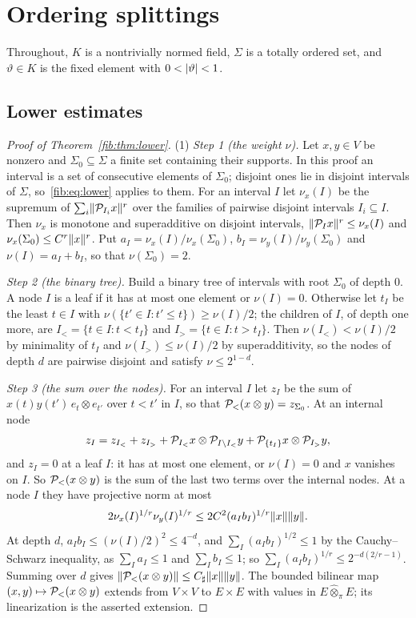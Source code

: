 \section{Ordering splittings}\label{app:ordering}

Throughout, $K$ is a nontrivially normed field, $\Sigma$ is a totally ordered set, and $\vartheta\in K$ is the fixed
element with $0<\lvert \vartheta\rvert<1$.

\subsection{Lower estimates}\label{ord:ssec:lower}

\begin{proof}[Proof of Theorem~\ref{fib:thm:lower}]
(1) \emph{Step 1 (the weight $\nu$).} Let $x,y\in V$ be nonzero and $\Sigma_0\subseteq\Sigma$ a finite set containing
their supports. In this proof an interval is a set of consecutive elements of $\Sigma_0$; disjoint ones lie in disjoint
intervals of $\Sigma$, so~\eqref{fib:eq:lower} applies to them. For an interval $I$ let $\nu_x(I)$ be the supremum of
$\sum_i\lVert \mathcal P_{I_i}x\rVert^r$ over the families of pairwise disjoint intervals $I_i\subseteq I$. Then $\nu_x$ is monotone
and superadditive on disjoint intervals, $\lVert \mathcal P_Ix\rVert^r\le\nu_x(I)$ and $\nu_x(\Sigma_0)\le C^r\lVert x\rVert^r$. Put
$a_I=\nu_x(I)/\nu_x(\Sigma_0)$, $b_I=\nu_y(I)/\nu_y(\Sigma_0)$ and $\nu(I)=a_I+b_I$, so that $\nu(\Sigma_0)=2$.

\emph{Step 2 (the binary tree).} Build a binary tree of intervals with root $\Sigma_0$ of depth $0$. A node $I$ is a leaf
if it has at most one element or $\nu(I)=0$. Otherwise let $t_I$ be the least $t\in I$ with
$\nu(\{t'\in I:t'\le t\})\ge\nu(I)/2$; the children of $I$, of depth one more, are $I_<=\{t\in I:t<t_I\}$ and
$I_>=\{t\in I:t>t_I\}$. Then $\nu(I_<)<\nu(I)/2$ by minimality of $t_I$ and $\nu(I_>)\le\nu(I)/2$ by superadditivity,
so the nodes of depth $d$ are pairwise disjoint and satisfy $\nu\le2^{1-d}$.

\emph{Step 3 (the sum over the nodes).} For an interval $I$ let $z_I$ be the sum of $x(t)y(t')\,e_t\otimes e_{t'}$ over
$t<t'$ in $I$, so that $\mathcal P_<(x\otimes y)=z_{\Sigma_0}$. At an internal node
\[
 z_I=z_{I_<}+z_{I_>}+\mathcal P_{I_<}x\otimes\mathcal P_{I\setminus I_<}y+\mathcal P_{\{t_I\}}x\otimes\mathcal P_{I_>}y,
\]
and $z_I=0$ at a leaf $I$: it has at most one element, or $\nu(I)=0$ and $x$ vanishes on $I$. So
$\mathcal P_<(x\otimes y)$ is the sum of the last two terms over the internal nodes. At a node $I$ they have projective norm
at most
\[
 2\nu_x(I)^{1/r}\nu_y(I)^{1/r}\le2C^2(a_Ib_I)^{1/r}\lVert x\rVert\lVert y\rVert.
\]
At depth $d$, $a_Ib_I\le(\nu(I)/2)^2\le4^{-d}$, and $\sum_I(a_Ib_I)^{1/2}\le1$ by the Cauchy--Schwarz inequality, as
$\sum_Ia_I\le1$ and $\sum_Ib_I\le1$; so $\sum_I(a_Ib_I)^{1/r}\le2^{-d(2/r-1)}$. Summing over $d$ gives
$\lVert \mathcal P_<(x\otimes y)\rVert\le C_\sharp\lVert x\rVert\lVert y\rVert$. The bounded bilinear map $(x,y)\mapsto\mathcal P_<(x\otimes y)$ extends
from $V\times V$ to $E\times E$ with values in $E\widehat\otimes_\pi E$; its linearization is the asserted extension.


\end{proof}
